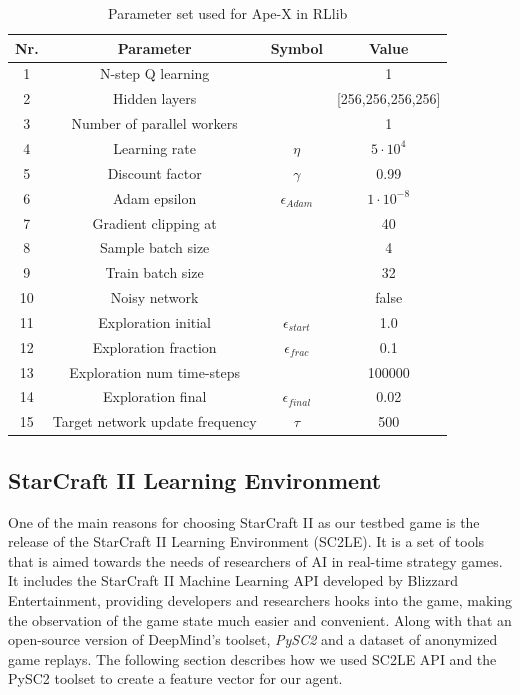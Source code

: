 \documentclass[12pt,a4paper]{article}
\begin{document}
\begin{table}
    \begin{center}
        \begin{tabular}{| c | c | c | c |}
            \hline
            Nr. & {\bf Parameter} & {\bf Symbol} & {\bf Value} \\
            \hline
            \hline
            1 & N-step Q learning &  & 1 \\
            \hline
            2 & Hidden layers &  & [256,256,256,256] \\
            \hline
            3 & Number of parallel workers &  & 1 \\
            \hline
            \hline
            4 & Learning rate & $\eta$ & $5 \cdot 10^4$ \\
            \hline
            5 & Discount factor & $\gamma$ & 0.99 \\
            \hline
            6 &Adam epsilon & $\epsilon_{Adam}$ & $1 \cdot 10^{-8}$ \\
            \hline
            7 & Gradient clipping at &  & 40 \\
            \hline
            8 & Sample batch size & & 4 \\
            \hline
            9 & Train batch size &  & 32 \\
            \hline
            10 & Noisy network &  & false \\
            \hline
            \hline
            11 & Exploration initial & $\epsilon_{start}$ & 1.0 \\
            \hline
            12 & Exploration fraction & $\epsilon_{frac}$ & 0.1 \\
            \hline
            13 & Exploration num time-steps &  & 100000 \\
            \hline
            14 & Exploration final & $\epsilon_{final}$ & 0.02 \\
            \hline
            15 & Target network update frequency & $\tau$ & 500 \\
            \hline
        \end{tabular}
        \caption{Parameter set used for Ape-X in RLlib}
        \label{tab:apex_params}
    \end{center}
\end{table} 
\subsection{StarCraft II Learning Environment}
One of the main reasons for choosing StarCraft II as our testbed game is the release of the StarCraft II Learning Environment (SC2LE). It is a set of tools that is aimed towards the needs of researchers of AI in real-time strategy games. It includes the StarCraft II Machine Learning API developed by Blizzard Entertainment, providing developers and researchers hooks into the game, making the observation of the game state much easier and convenient. Along with that an open-source version of DeepMind's toolset, {\it PySC2} and a dataset of anonymized game replays. The following section describes how we used SC2LE API and the PySC2 toolset to create a feature vector for our agent.
\label{sec:SC2API}
\end{document}
